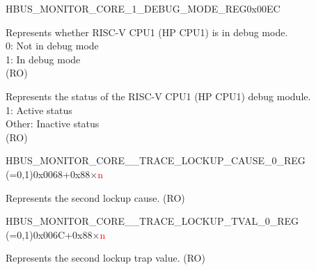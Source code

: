 \begin{register}{H}{BUS\_MONITOR\_CORE\_1\_DEBUG\_MODE\_REG}{0x00EC}\label{regdesc:BUSMONITORCORE1DEBUGMODEREG}
%
%
%
\regnewline%
\begin{regdesc}\begin{reglist}
\label{fielddesc:BUSMONITORCORE1DEBUGMODE}\item [BUS\_MONITOR\_CORE\_1\_DEBUG\_MODE] Represents whether RISC-V CPU1 (HP CPU1) is in debug mode.\\
0: Not in debug mode\\
1: In debug mode\\ (RO)
\label{fielddesc:BUSMONITORCORE1DEBUGMODULEACTIVE}\item [BUS\_MONITOR\_CORE\_1\_DEBUG\_MODULE\_ACTIVE] Represents the status of the RISC-V CPU1 (HP CPU1) debug module.\\
1: Active status\\
Other: Inactive status\\ (RO)
\end{reglist}\end{regdesc}
\end{register}


\begin{register}{H}{BUS\_MONITOR\_CORE\_\_TRACE\_LOCKUP\_CAUSE\_0\_REG (=0,1)}{0x0068+0x88×\textcolor{red}{n}}\label{regdesc:BUSMONITORCORE0TRACELOCKUPCAUSE0REG}
%
%
\regnewline%
\begin{regdesc}\begin{reglist}
\label{fielddesc:BUSMONITORCORE0TRACELOCKUPRECORDINGCAUSE0}\item [BUS\_MONITOR\_CORE\_\regindex{n}\_TRACE\_LOCKUP\_RECORDING\_CAUSE\_0] Represents the second lockup cause. (RO)
\end{reglist}\end{regdesc}
\end{register}


\begin{register}{H}{BUS\_MONITOR\_CORE\_\_TRACE\_LOCKUP\_TVAL\_0\_REG (=0,1)}{0x006C+0x88×\textcolor{red}{n}}\label{regdesc:BUSMONITORCORE0TRACELOCKUPTVAL0REG}
%
\regnewline%
\begin{regdesc}\begin{reglist}
\label{fielddesc:BUSMONITORCORE0TRACELOCKUPRECORDINGTVAL0}\item [BUS\_MONITOR\_CORE\_\regindex{n}\_TRACE\_LOCKUP\_RECORDING\_TVAL\_0] Represents the second lockup trap value. (RO)
\end{reglist}\end{regdesc}
\end{register}


